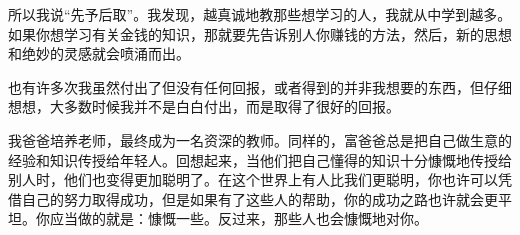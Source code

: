 所以我说“先予后取”。我发现，越真诚地教那些想学习的人，我就从中学到越多。如果你想学习有关金钱的知识，那就要先告诉别人你赚钱的方法，然后，新的思想和绝妙的灵感就会喷涌而出。

也有许多次我虽然付出了但没有任何回报，或者得到的并非我想要的东西，但仔细想想，大多数时候我并不是白白付出，而是取得了很好的回报。

我爸爸培养老师，最终成为一名资深的教师。同样的，富爸爸总是把自己做生意的经验和知识传授给年轻人。回想起来，当他们把自己懂得的知识十分慷慨地传授给别人时，他们也变得更加聪明了。在这个世界上有人比我们更聪明，你也许可以凭借自己的努力取得成功，但是如果有了这些人的帮助，你的成功之路也许就会更平坦。你应当做的就是：慷慨一些。反过来，那些人也会慷慨地对你。
